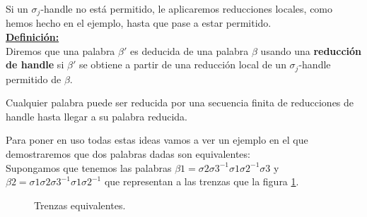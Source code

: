 Si un $\sigma_{j}$-handle no está permitido, le aplicaremos reducciones locales, como hemos hecho en el ejemplo, hasta que pase a estar permitido.\\

\underline{\textbf{Definición:}} \\
Diremos que una palabra $\beta'$ es deducida de una palabra $\beta$ usando una \textbf{reducción de handle} si $\beta'$ se obtiene a partir de una reducción local de un $\sigma_{j}$-handle permitido de $\beta$.\\

\begin{teo}
	Cualquier palabra puede ser reducida por una secuencia finita de reducciones de handle hasta llegar a su palabra reducida.
\end{teo}

\bigskip
Para poner en uso todas estas ideas vamos a ver un ejemplo en el que demostraremos que dos palabras dadas son equivalentes:\\
Supongamos que tenemos las palabras $\beta1=\sigma2\sigma3^{-1}\sigma1\sigma2^{-1}\sigma3$ y $\beta2=\sigma1\sigma2\sigma3^{-1}\sigma1\sigma2^{-1}$ que representan a las trenzas que la figura \ref{h4}.\\

\begin{figure}[h!]
	\centering
	\caption{Trenzas equivalentes.}
	\label{h4} 
\end{figure}

